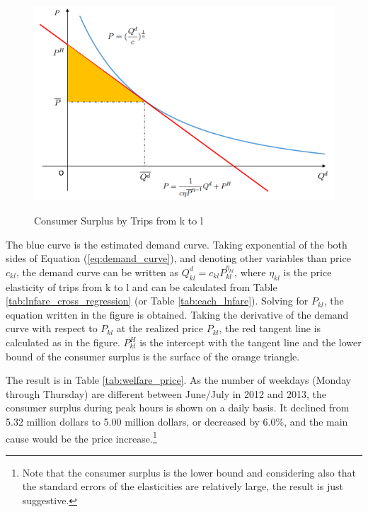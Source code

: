 \begin{figure}[h]
\centering
\caption{Consumer Surplus by Trips from k to l}\label{fig:welfare_price}\\
\vspace{0.2cm}
\includegraphics[width=12cm]{Figures/welfare_price.png}
\vspace{1.0cm}
\end{figure}


The blue curve is the estimated demand curve. Taking exponential of the both sides of Equation (\ref{eq:demand_curve}), and denoting other variables than price $c_{kl}$, the demand curve can be written as $Q^d_{kl}= c_{kl}P_{kl}^{\eta_{kl}}$, where $\eta_{kl}$ is the price elasticity of trips from k to l and can be calculated from Table \ref{tab:lnfare_cross_regression} (or Table \ref{tab:each_lnfare}). Solving for $P_{kl}$, the equation written in the figure is obtained. Taking the derivative of the demand curve with respect to $P_{kl}$ at the realized price $\overline{P_{kl}}$, the red tangent line is calculated as in the figure. $P^H_{kl}$ is the intercept with the tangent line and the lower bound of the consumer surplus is the surface of the orange triangle.

The result is in Table \ref{tab:welfare_price}. As the number of weekdays (Monday through Thursday) are different between June/July in 2012 and 2013, the consumer surplus during peak hours is shown on a daily basis. It declined from 5.32 million dollars to 5.00 million dollars, or decreased by 6.0\%, and the main cause would be the price increase.\footnote{Note that the consumer surplus is the lower bound and considering also that the standard errors of the elasticities are relatively large, the result is just suggestive.}



